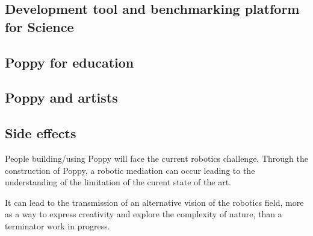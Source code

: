 \subsection{Development tool and benchmarking platform for Science} %

\subsection{Poppy for education} %

\subsection{Poppy and artists} %


\subsection{Side effects} %
People building/using Poppy will face the current robotics challenge. Through the construction of Poppy, a robotic mediation can occur leading to the understanding of the limitation of the curent state of the art.

It can lead to the transmission of an alternative vision of the robotics field, more as a way to express creativity and explore the complexity of nature, than a terminator work in progress.


